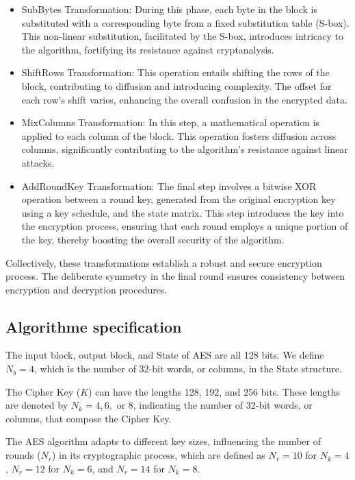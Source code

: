 \documentclass[runningheads]{llncs}
\begin{document}
\begin{itemize}
    \item SubBytes Transformation: During this phase, each byte in the block is substituted with a corresponding byte from a fixed substitution table (S-box). This non-linear substitution, facilitated by the S-box, introduces intricacy to the algorithm, fortifying its resistance against cryptanalysis.
    \item ShiftRows Transformation: This operation entails shifting the rows of the block, contributing to diffusion and introducing complexity. The offset for each row's shift varies, enhancing the overall confusion in the encrypted data.
    \item MixColumns Transformation: In this step, a mathematical operation is applied to each column of the block. This operation fosters diffusion across columns, significantly contributing to the algorithm's resistance against linear attacks.
    \item AddRoundKey Transformation: The final step involves a bitwise XOR operation between a round key, generated from the original encryption key using a key schedule, and the state matrix. This step introduces the key into the encryption process, ensuring that each round employs a unique portion of the key, thereby boosting the overall security of the algorithm.
\end{itemize}

Collectively, these transformations establish a robust and secure encryption process. The deliberate symmetry in the final round ensures consistency between encryption and decryption procedures.

\subsection{Algorithme specification}



The input block, output block, and State of AES are all 128 bits. We define $N_b = 4$, which is the number of 32-bit words, or columns, in the State structure.

The Cipher Key ($K$) can have the lengths 128, 192, and 256 bits. These lengths are denoted by $N_k = 4, 6,$ or $8$, indicating the number of 32-bit words, or columns, that compose the Cipher Key.

The AES algorithm adapts to different key sizes, influencing the number of rounds ($N_r$) in its cryptographic process, which are defined as $N_r = 10$ for $N_k = 4$, $N_r = 12$ for $N_k = 6$, and $N_r = 14$ for $N_k = 8$.
\end{document}
